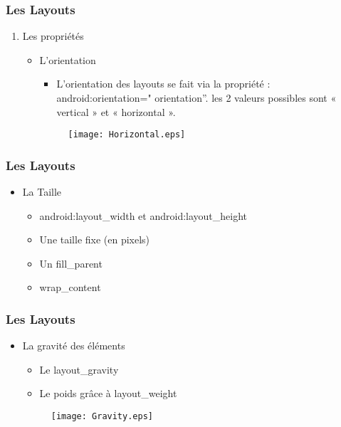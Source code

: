\documentclass{beamer}
\begin{document}
\begin{frame}
  \frametitle{Les Layouts}
   \begin{enumerate}[2]
        \item Les propriétés
            \begin{itemize}
              \item L'orientation
              \begin{itemize}
              \item L’orientation des layouts se fait via la propriété : android:orientation=" orientation”.
les 2 valeurs possibles sont « vertical » et « horizontal ».
            \end{itemize}
        \begin{figure}
          \centering
            \texttt{[image: Horizontal.eps]}
        \end{figure}
            \end{itemize}
    \end{enumerate}
\end{frame}



\begin{frame}
 \frametitle{Les Layouts}
    \begin{itemize}
            \item La Taille
                \begin{itemize}
                     \item android:layout\_width et android:layout\_height
                     \item Une taille fixe (en pixels)
                     \item Un fill\_parent
                     \item wrap\_content
                \end{itemize}
    \end{itemize}
\end{frame}



\begin{frame}
    \frametitle{Les Layouts}
        \begin{itemize}
            \item La gravité des éléments
                \begin{itemize}
                    \item Le layout\_gravity
                    \item Le poids grâce à layout\_weight
                \end{itemize}
            \begin{figure}
                \centering
                \texttt{[image: Gravity.eps]}
            \end{figure}
    \end{itemize}
\end{frame}
\end{document}
